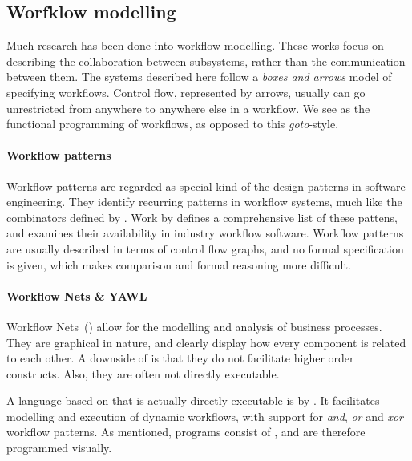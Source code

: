 


\subsection{Worfklow modelling}

Much research has been done into workflow modelling. These works focus on
describing the collaboration between subsystems, rather than the communication
between them.
The systems described here follow a \emph{boxes and arrows} model of specifying workflows.
Control flow, represented by arrows, usually can go unrestricted from anywhere to anywhere else in a workflow.
We see \TOP as the functional programming of workflows, as opposed to this \emph{goto}-style.

\paragraph{Workflow patterns}

Workflow patterns are regarded as special kind of the design patterns in
software engineering. They identify recurring patterns in workflow systems, much
like the combinators defined by \TOPHAT. Work by \citet{journals/dpd/AalstHKB03}
defines a comprehensive list of these
pattens, and examines their availability in industry workflow software.
Workflow patterns are usually described in terms of control flow graphs, and no
formal specification is given, which makes comparison and formal reasoning more
difficult.

\paragraph{Workflow Nets \& YAWL}

Workflow Nets~(\WFN) \cite{journals/jcsc/Aalst98} allow for the modelling and analysis of business processes.
They are graphical in nature, and clearly display how every component is related to each other.
A downside of \WFN is that they do not facilitate higher order constructs.
Also, they are often not directly executable.

A language based on \WFN that is actually directly executable is \YAWL by \citet{DBLP:journals/is/AalstH05}.
It facilitates modelling and execution of dynamic workflows, with support for \emph{and}, \emph{or} and \emph{xor} workflow patterns.
As mentioned, \YAWL programs consist of \WFN, and are therefore programmed visually.

